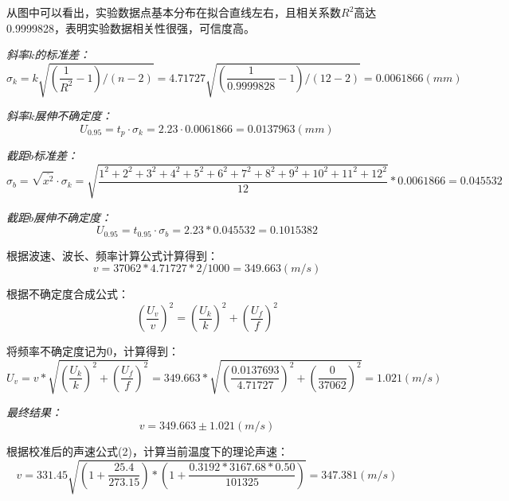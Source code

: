 \documentclass[UTF8]{ctexart}
\begin{document}
    从图中可以看出，实验数据点基本分布在拟合直线左右，且相关系数$R^2$高达0.9999828，表明实验数据相关性很强，可信度高。

    \emph{斜率$k$的标准差：}
    \begin{equation*}
        \sigma_k =k\sqrt{(\frac{1}{R^2}-1)/(n-2)}=4.71727\sqrt{(\frac{1}{0.9999828}-1)/(12-2)} =0.0061866(mm)
    \end{equation*}

    \emph{斜率$k$展伸不确定度：}
    \begin{equation*}
        U_{0.95}=t_p·\sigma_k=2.23·0.0061866=0.0137963(mm)
    \end{equation*}

    \emph{截距$b$标准差：}
    \begin{equation*}
        \sigma_b=\sqrt{\overline{{x^2}}}·\sigma_k=\sqrt{\frac{1^2+2^2+3^2+4^2+5^2+6^2+7^2+8^2+9^2+10^2+11^2+12^2}{12}}*0.0061866=0.045532
    \end{equation*}

    \emph{截距$b$展伸不确定度：}
    \begin{equation*}
        U_{0.95}=t_{0.95}·\sigma_b=2.23*0.045532=0.1015382
    \end{equation*}
    
    根据波速、波长、频率计算公式计算得到：
    \begin{equation*}
        v=37062*4.71727*2/1000=349.663(m/s)
    \end{equation*}

    根据不确定度合成公式：
    \begin{equation}
        (\frac{U_v}{v})^2=(\frac{U_k}{k})^2+(\frac{U_f}{f})^2
    \end{equation}

    将频率不确定度记为0，计算得到：
    \begin{equation*}
        U_v=v*\sqrt{(\frac{U_k}{k})^2+(\frac{U_f}{f})^2}=349.663*\sqrt{(\frac{0.0137693}{4.71727})^2+(\frac{0}{37062})^2}=1.021(m/s)
    \end{equation*}

    \emph{最终结果：}
    \begin{equation}
        v=349.663±1.021(m/s)
    \end{equation}


    根据校准后的声速公式(2)，计算当前温度下的理论声速：
    \begin{equation*}
        v=331.45\sqrt{(1+\frac{25.4}{273.15})*(1+\frac{0.3192*3167.68*0.50}{101325})}=347.381(m/s)
    \end{equation*}
\end{document}

